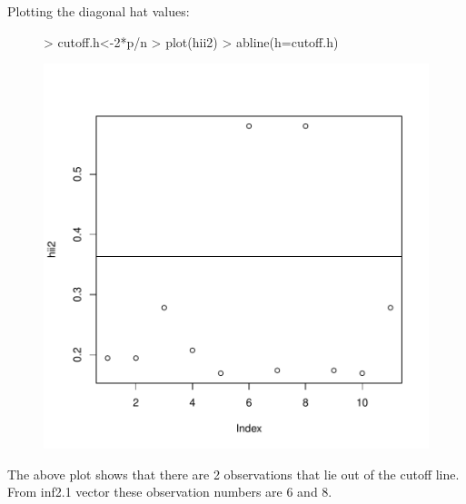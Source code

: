 \documentclass[12pt]{article}
\begin{document}
\begin{itemize}
Plotting the  diagonal hat values:
\begin{figure}[H]
\begin{Schunk}
\begin{Sinput}
> cutoff.h<-2*p/n
> plot(hii2)
> abline(h=cutoff.h)
\end{Sinput}
\end{Schunk}
\includegraphics{HW6-017}
\end{figure}
The above plot shows that there are 2 observations that lie out of the cutoff line. From inf2.1 vector these observation numbers are 6 and 8.
\clearpage


\end{itemize}
\end{document}
